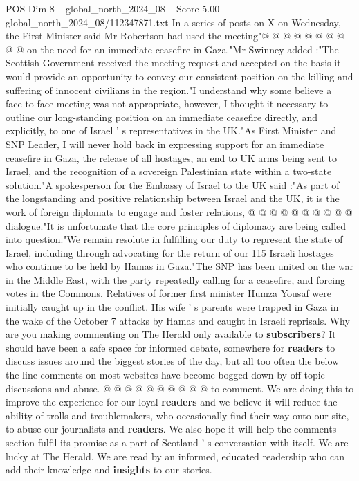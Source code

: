 \begin{textsample}{POS Dim 8 – global\_north\_2024\_08 – Score 5.00 – global\_north\_2024\_08/112347871.txt}
In a series of posts on X on Wednesday, the First Minister said Mr Robertson had used the meeting"@ @ @ @ @ @ @ @ @ @ on the need for an immediate ceasefire in Gaza."Mr Swinney added :"The Scottish Government received the meeting request and accepted on the basis it would provide an opportunity to convey our consistent position on the killing and suffering of innocent civilians in the region."I understand why some believe a face-to-face meeting was not appropriate, however, I thought it necessary to outline our long-standing position on an immediate ceasefire directly, and explicitly, to one of Israel ' s representatives in the UK."As First Minister and SNP Leader, I will never hold back in expressing support for an immediate ceasefire in Gaza, the release of all hostages, an end to UK arms being sent to Israel, and the recognition of a sovereign Palestinian state within a two-state solution."A spokesperson for the Embassy of Israel to the UK said :"As part of the longstanding and positive relationship between Israel and the UK, it is the work of foreign diplomats to engage and foster relations, @ @ @ @ @ @ @ @ @ @ dialogue."It is unfortunate that the core principles of diplomacy are being called into question."We remain resolute in fulfilling our duty to represent the state of Israel, including through advocating for the return of our 115 Israeli hostages who continue to be held by Hamas in Gaza."The SNP has been united on the war in the Middle East, with the party repeatedly calling for a ceasefire, and forcing votes in the Commons.
Relatives of former first minister Humza Yousaf were initially caught up in the conflict.
His wife ' s parents were trapped in Gaza in the wake of the October 7 attacks by Hamas and caught in Israeli reprisals.
Why are you making commenting on The Herald only available to \textbf{subscribers}?
It should have been a safe space for informed debate, somewhere for \textbf{readers} to discuss issues around the biggest stories of the day, but all too often the below the line comments on most websites have become bogged down by off-topic discussions and abuse. @ @ @ @ @ @ @ @ @ @ to comment.
We are doing this to improve the experience for our loyal \textbf{readers} and we believe it will reduce the ability of trolls and troublemakers, who occasionally find their way onto our site, to abuse our journalists and \textbf{readers}.
We also hope it will help the comments section fulfil its promise as a part of Scotland ' s conversation with itself.
We are lucky at The Herald.
We are read by an informed, educated readership who can add their knowledge and \textbf{insights} to our stories.

\end{textsample}
